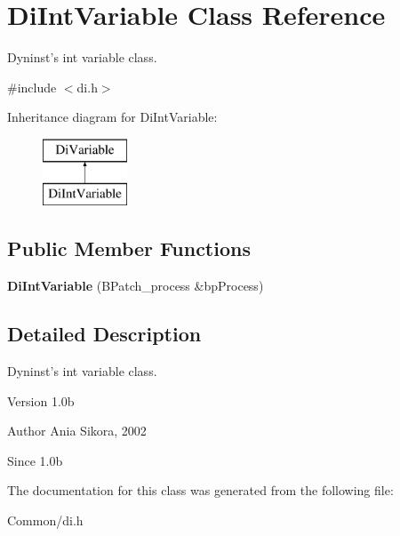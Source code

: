 \hypertarget{class_di_int_variable}{\section{Di\-Int\-Variable Class Reference}
\label{class_di_int_variable}
}


Dyninst's int variable class.  




{\ttfamily \#include $<$di.\-h$>$}

Inheritance diagram for Di\-Int\-Variable\-:\begin{figure}[H]
\begin{center}
\leavevmode
\includegraphics[height=2.000000cm]{class_di_int_variable}
\end{center}
\end{figure}
\subsection*{Public Member Functions}
\begin{DoxyCompactItemize}
\item 
\hypertarget{class_di_int_variable_aa43e23ff3f886dc3ec8266b4d5185d59}{{\bfseries Di\-Int\-Variable} (B\-Patch\-\_\-process \&bp\-Process)}\label{class_di_int_variable_aa43e23ff3f886dc3ec8266b4d5185d59}

\end{DoxyCompactItemize}


\subsection{Detailed Description}
Dyninst's int variable class. 

\begin{DoxyVersion}{Version}
1.\-0b 
\end{DoxyVersion}
\begin{DoxyAuthor}{Author}
Ania Sikora, 2002 
\end{DoxyAuthor}
\begin{DoxySince}{Since}
1.\-0b 
\end{DoxySince}


The documentation for this class was generated from the following file\-:\begin{DoxyCompactItemize}
\item 
Common/di.\-h\end{DoxyCompactItemize}
